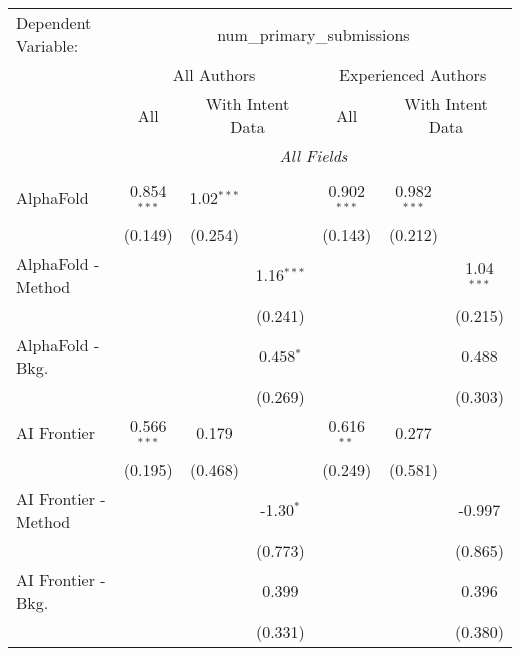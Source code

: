 \begingroup
\centering
\begin{tabular}{lcccccc}
   \tabularnewline \midrule \midrule
   Dependent Variable: & \multicolumn{6}{c}{num\_primary\_submissions}\\
 & \multicolumn{3}{c}{All Authors} & \multicolumn{3}{c}{Experienced Authors} \\
\cmidrule(lr){2-4} \cmidrule(lr){5-7}
 & \multicolumn{1}{c}{All} & \multicolumn{2}{c}{With Intent Data} & \multicolumn{1}{c}{All} & \multicolumn{2}{c}{With Intent Data} \\
\cmidrule(lr){2-2} \cmidrule(lr){3-4} \cmidrule(lr){5-5} \cmidrule(lr){6-7}
 & \multicolumn{6}{c}{\textit{All Fields}} \\ \\
   AlphaFold            & 0.854$^{***}$ & 1.02$^{***}$ &               & 0.902$^{***}$ & 0.982$^{***}$ &   \\   
                        & (0.149)       & (0.254)      &               & (0.143)       & (0.212)       &   \\   
   AlphaFold - Method   &               &              & 1.16$^{***}$  &               &               & 1.04$^{***}$\\   
                        &               &              & (0.241)       &               &               & (0.215)\\   
   AlphaFold - Bkg.     &               &              & 0.458$^{*}$   &               &               & 0.488\\   
                        &               &              & (0.269)       &               &               & (0.303)\\   
   AI Frontier          & 0.566$^{***}$ & 0.179        &               & 0.616$^{**}$  & 0.277         &   \\   
                        & (0.195)       & (0.468)      &               & (0.249)       & (0.581)       &   \\   
   AI Frontier - Method &               &              & -1.30$^{*}$   &               &               & -0.997\\   
                        &               &              & (0.773)       &               &               & (0.865)\\   
   AI Frontier - Bkg.   &               &              & 0.399         &               &               & 0.396\\   
                        &               &              & (0.331)       &               &               & (0.380)\\   

\end{tabular}
